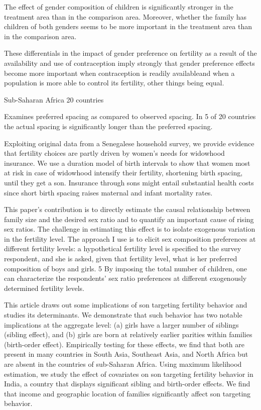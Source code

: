 The effect of gender composition of children is significantly stronger in the treatment area than in the comparison area. Moreover, whether the family has children of both genders seems to be more important in the treatment area than in the comparison area.

These differentials in the impact of gender preference on fertility as a result of the availability and use of contraception imply strongly that gender preference effects become more important when contraception is readily availableand when a population is more able to control its fertility, other things being equal.

\citep{Rafalitnanana2000} 

Sub-Saharan Africa 20 countries

Examines preferred spacing as compared to observed spacing. In 5 of 20 countries the
actual spacing is significantly longer than the preferred spacing.


\citep{Lambert2016}

Exploiting original data from a Senegalese household survey, we provide evidence that fertility choices are partly driven by women's needs for widowhood insurance. We use a duration model of birth intervals to show that women most at risk in case of widowhood intensify their fertility, shortening birth spacing, until they get a son. Insurance through sons might entail substantial health costs since short birth spacing raises maternal and infant mortality rates.

\citep{Jayachandran2017}

This paper’s contribution is to directly estimate the causal relationship between family size and the desired sex ratio and to quantify an important cause of rising sex ratios. The challenge in estimating this effect is to isolate exogenous variation in the fertility level. The approach I use is to elicit sex composition preferences at different fertility levels: a hypothetical fertility level is specified to the survey respondent, and she is asked, given that fertility level, what is her preferred composition of boys and
girls. 5 By imposing the total number of children, one can characterize the respondents’ sex ratio preferences at different exogenously determined fertility levels.


\citep{Basu2010}

This article draws out some implications of son targeting fertility behavior and studies its determinants. We demonstrate that such behavior has two notable implications at the aggregate level: (a) girls have a larger number of siblings (sibling effect), and (b) girls are born at relatively earlier parities within families (birth-order effect). Empirically testing for these effects, we find that both are present in many countries in South Asia, Southeast Asia, and North Africa but are absent in the countries of sub-Saharan Africa. Using maximum likelihood estimation, we study the effect of covariates on son targeting fertility behavior in India, a country that displays significant sibling and birth-order effects. We find that income and geographic location of families significantly affect son targeting behavior.

